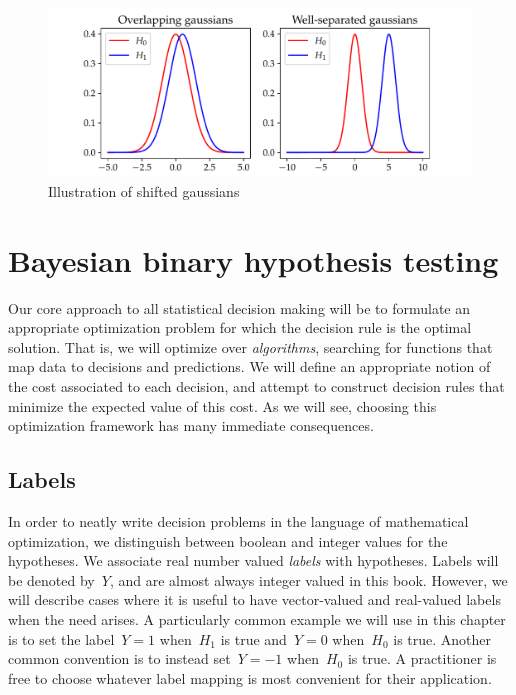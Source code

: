 \documentclass{tufte-book}
\begin{document}
\begin{figure}
\centering
\includegraphics{assets/shifted_gaussians}
\caption{Illustration of shifted gaussians}
\end{figure}

\hypertarget{bayesian-binary-hypothesis-testing}{%
\section{Bayesian binary hypothesis
testing}\label{bayesian-binary-hypothesis-testing}}

Our core approach to all statistical decision making will be to
formulate an appropriate optimization problem for which the decision
rule is the optimal solution. That is, we will optimize over
\emph{algorithms}, searching for functions that map data to decisions
and predictions. We will define an appropriate notion of the cost
associated to each decision, and attempt to construct decision rules
that minimize the expected value of this cost. As we will see, choosing
this optimization framework has many immediate consequences.

\hypertarget{labels}{%
\subsection{Labels}\label{labels}}

In order to neatly write decision problems in the language of
mathematical optimization, we distinguish between boolean and integer
values for the hypotheses. We associate real number valued \emph{labels}
with hypotheses. Labels will be denoted by~\(Y\), and are almost always
integer valued in this book. However, we will describe cases where it is
useful to have vector-valued and real-valued labels when the need
arises. A particularly common example we will use in this chapter is to
set the label~\(Y=1\) when~\(H_1\) is true and~\(Y=0\) when~\(H_0\) is
true. Another common convention is to instead set~\(Y=-1\) when~\(H_0\)
is true. A practitioner is free to choose whatever label mapping is most
convenient for their application.
\end{document}
